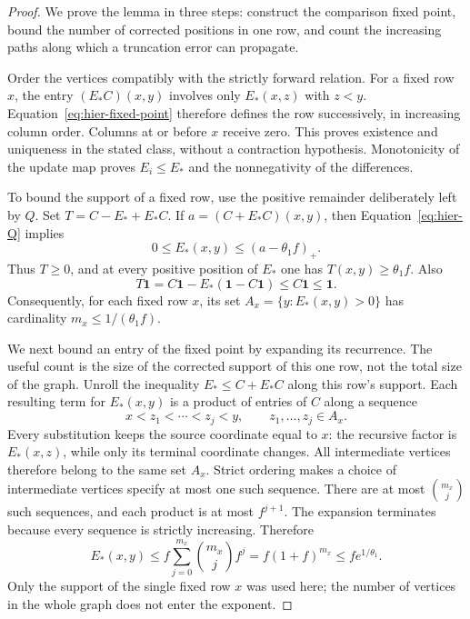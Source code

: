 \begin{proof}
We prove the lemma in three steps: construct the comparison fixed point, bound the number of corrected positions in one row, and count the increasing paths along which a truncation error can propagate.

Order the vertices compatibly with the strictly forward relation.  For a
fixed row $x$, the entry $(E_*C)(x,y)$ involves only $E_*(x,z)$ with
$z<y$.  Equation~\eqref{eq:hier-fixed-point} therefore defines the row
successively, in increasing column order.  Columns at or before $x$
receive zero.  This proves existence and uniqueness in the stated class,
without a contraction hypothesis.  Monotonicity of the update map proves
$E_i\leq E_*$ and the nonnegativity of the differences.

To bound the support of a fixed row, use the positive remainder deliberately left by $Q$. Set $T=C-E_*+E_*C$. If $a=(C+E_*C)(x,y)$, then
Equation~\eqref{eq:hier-Q} implies
\[
 0\leq E_*(x,y)\leq(a-\theta_1f)_+.
\]
Thus $T\geq0$, and at every positive position of $E_*$ one has
$T(x,y)\geq\theta_1f$.  Also
\begin{equation}
 T\mathbf 1=C\mathbf 1-E_*(\mathbf 1-C\mathbf 1)
       \leq C\mathbf 1\leq\mathbf 1.
 \label{eq:hier-fixed-residual-mass}
\end{equation}
Consequently, for each fixed row $x$, its set
$A_x=\{y:E_*(x,y)>0\}$ has cardinality
$m_x\leq1/(\theta_1f)$.

We next bound an entry of the fixed point by expanding its recurrence. The useful count is the size of the corrected support of this one row, not the total size of the graph. Unroll the inequality $E_*\leq C+E_*C$ along this row's support.
Each resulting term for $E_*(x,y)$ is a product of entries of $C$
along a sequence
\[
 x<z_1<\cdots<z_j<y,
 \qquad z_1,\ldots,z_j\in A_x.
\]
Every substitution keeps the source coordinate equal to $x$: the
recursive factor is $E_*(x,z)$, while only its terminal coordinate
changes.  All intermediate vertices therefore belong to the same set
$A_x$.  Strict ordering makes a choice of intermediate vertices specify
at most one such sequence.
There are at most $\binom{m_x}{j}$ such sequences, and each product
is at most $f^{j+1}$.  The expansion terminates because every sequence
is strictly increasing.  Therefore
\begin{equation}
 E_*(x,y)\leq
 f\sum_{j=0}^{m_x}\binom{m_x}{j}f^j
 =f(1+f)^{m_x}\leq fe^{1/\theta_1}.
 \label{eq:hier-fixed-entry}
\end{equation}
Only the support of the single fixed row $x$ was used here; the number
of vertices in the whole graph does not enter the exponent.


\end{proof}
